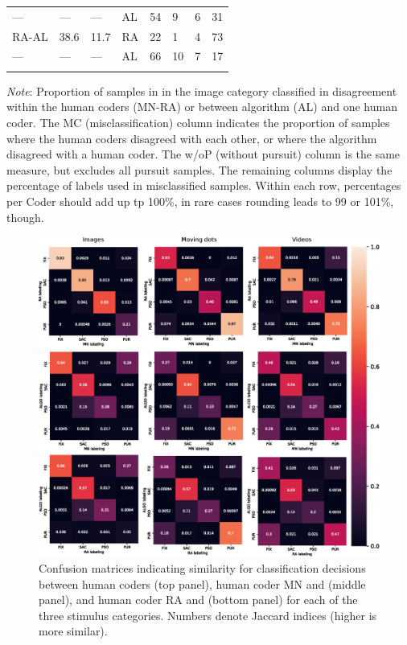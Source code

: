 \begin{table}[h!]
\begin{tabular}{llllllll}
		--- & --- & --- & AL & 54 & 9 & 6 & 31\\
		RA-AL & 38.6 & 11.7 & RA & 22 & 1 & 4 & 73 \\
		---& ---& ---& AL & 66 & 10 & 7 & 17 \\
		\noalign{\smallskip}\hline
	\end{tabular}
\textit{Note}: Proportion of samples in in the image category classified in disagreement within the human coders (MN-RA) or between \remodnav algorithm (AL) and one human coder. The MC (misclassification) column indicates the proportion of samples where the human coders disagreed with each other, or where the algorithm disagreed with a human coder. The w/oP (without pursuit) column is the same measure, but excludes all pursuit samples. The remaining columns display the percentage of labels used in misclassified samples. Within each row, percentages per Coder should add up tp 100\%, in rare cases rounding leads to 99 or 101\%, though.
\end{table}


\begin{figure}
	\includegraphics[width=1\textwidth]{img/conf_drawing.eps}
	\caption{Confusion matrices indicating similarity for classification decisions between human coders (top panel), human coder MN and \remodnav (middle panel), and human coder RA and \remodnav (bottom panel) for each of the three stimulus categories. Numbers denote Jaccard indices (higher is more similar).}
	\label{fig:conf}       %
\end{figure}

